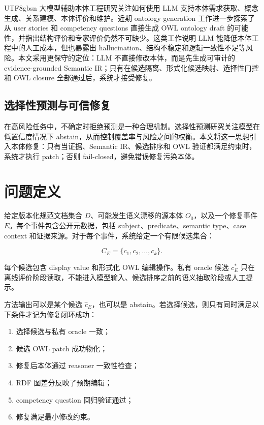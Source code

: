 \documentclass[11pt]{article}
\begin{document}
\begin{CJK*}{UTF8}{gbsn}
大模型辅助本体工程研究关注如何使用 LLM 支持本体需求获取、概念生成、关系建模、本体评价和维护\cite{llmontology2026survey}。近期 ontology generation 工作进一步探索了从 user stories 和 competency questions 直接生成 OWL ontology draft 的可能性，并指出结构评价和专家评价仍然不可缺少\cite{lippolis2025ontologygeneration}。这类工作说明 LLM 能降低本体工程中的人工成本，但也暴露出 hallucination、结构不稳定和逻辑一致性不足等风险。本文采用更保守的定位：LLM 不直接修改本体，而是先生成可审计的 evidence-grounded Semantic IR；只有在候选隔离、形式化候选映射、选择性门控和 OWL closure 全部通过后，系统才接受修复。

\subsection{选择性预测与可信修复}

在高风险任务中，不确定时拒绝预测是一种合理机制。选择性预测研究关注模型在低置信度情况下 abstain，从而控制覆盖率与风险之间的权衡\cite{geifman2017selective}。本文将这一思想引入本体修复：只有当证据、Semantic IR、候选排序和 OWL 验证都满足约束时，系统才执行 patch；否则 fail-closed，避免错误修复污染本体。

\section{问题定义}

给定版本化规范文档集合 $D$、可能发生语义漂移的源本体 $O_0$，以及一个修复事件 $E$。每个事件包含公开元数据，包括 subject、predicate、semantic type、case context 和证据来源。对于每个事件，系统给定一个有限候选集合：

\[
C_E = \{c_1, c_2, \ldots, c_k\}.
\]

每个候选包含 display value 和形式化 OWL 编辑操作。私有 oracle 候选 $c_E^*$ 只在离线评价阶段读取，不能进入模型输入、候选排序之前的语义抽取阶段或人工提示。

方法输出可以是某个候选 $\hat{c}_E$，也可以是 abstain。若选择候选，则只有同时满足以下条件才记为修复闭环成功：

\begin{enumerate}
    \item 选择候选与私有 oracle 一致；
    \item 候选 OWL patch 成功物化；
    \item 修复后本体通过 reasoner 一致性检查；
    \item RDF 图差分反映了预期编辑；
    \item competency question 回归验证通过；
    \item 修复满足最小修改约束。
\end{enumerate}


\end{CJK*}
\end{document}
